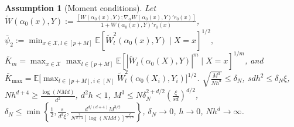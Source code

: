 \documentclass[10pt,a4paper]{amsart}
\newtheorem{assumption}{Assumption}
\begin{document}
\begin{assumption}[Moment conditions]\label{ass:moment-assumptions}
Let $\displaystyle\widetilde W(\alpha_0(x),Y)\!\!:=\!\!\frac{[\! W(\alpha_0(x),Y) ;\!\nabla_\alpha W(\alpha_0(x),Y)'r_0(x) ]}{1+W(\alpha_0(x),Y)'r_0(x)}$, $\bar \psi_2 := {\displaystyle \min_{x\in \mathcal{X}, l\in [p+M]}} \mathbb{E}[ \widetilde W_{l}^2(\alpha_0(x),Y)\mid X=x]^{1/2},$ $\bar K_m = {\displaystyle\max_{x\in \mathcal{X}}\max_{l\in [p+M]}}\mathbb{E}[|\widetilde W_{l}(\alpha_0(X),Y)|^m\mid X=x]^{1/m}$, and $\bar K_{\max} = \mathbb{E}\big[ {\displaystyle\max_{l\in [p+M], i \in [N]}}\widetilde W_{l}^2(\alpha_0(X_i),Y_i)\big]^{1/2}$. $\sqrt{\frac{M^3}{Nh^d}}\leq\delta_N$, $sdh^2\leq\delta_N\xi$, $Nh^{d+4}\geq\frac{\log(NMd)}{d^2}$, $d^2h<1$, $M^3\leq N\delta_N^{2+d/2}\left(\frac{\xi}{sd}\right)^{d/2}$, $\delta_N\leq\min\left\{\frac{1}{2},\frac{s}{d^3\xi},\frac{d^{d/(d+4)}M^{3/2}}{N^{\frac{2}{d+4}}[\log(NMd)]^{\frac{d}{2d+8}}}\right\}$, $\delta_N\rightarrow0$, $h\rightarrow0$, $Nh^d\rightarrow\infty$.
\end{assumption}
\end{document}
